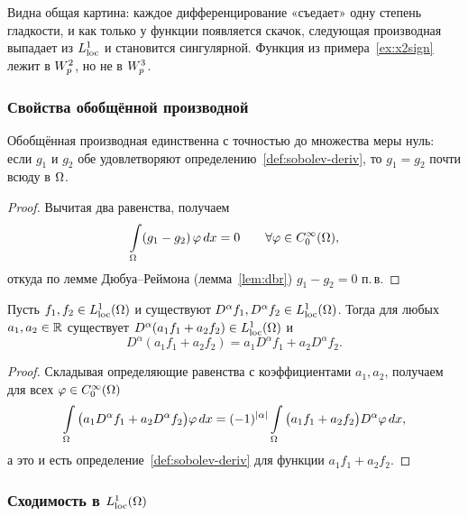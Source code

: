 \begin{idea}
Видна общая картина: каждое дифференцирование «съедает» одну степень гладкости, и как
только у функции появляется скачок, следующая производная выпадает из $L^1_{\mathrm{loc}}$ и становится
сингулярной. Функция из примера~\ref{ex:x2sign} лежит в $W_{p}^{2}$, но не в $W_{p}^{3}$.
\end{idea}

\subsubsection*{Свойства обобщённой производной}

\begin{proposition}\label{prop:deriv-unique}
Обобщённая производная единственна с точностью до множества меры нуль: если $g_1$ и $g_2$
обе удовлетворяют определению~\ref{def:sobolev-deriv}, то $g_1 = g_2$ почти всюду в $\Omega$.
\end{proposition}

\begin{proof}
Вычитая два равенства, получаем
\[
  \int\limits_\Omega (g_1 - g_2)\,\varphi\, dx = 0 \qquad \forall \varphi \in C_0^\infty(\Omega) ,
\]
откуда по лемме Дюбуа--Реймона (лемма~\ref{lem:dbr}) $g_1 - g_2 = 0$ п.\,в.
\end{proof}

\begin{proposition}\label{prop:deriv-linear}
Пусть $f_1, f_2 \in L^1_{\mathrm{loc}}(\Omega)$ и существуют $D^\alpha f_1, D^\alpha f_2 \in L^1_{\mathrm{loc}}(\Omega)$.
Тогда для любых $a_1, a_2 \in \mathbb{R}$ существует
$D^\alpha(a_1 f_1 + a_2 f_2) \in L^1_{\mathrm{loc}}(\Omega)$ и
\[
  D^\alpha(a_1 f_1 + a_2 f_2) = a_1 D^\alpha f_1 + a_2 D^\alpha f_2 .
\]
\end{proposition}

\begin{proof}
Складывая определяющие равенства с коэффициентами $a_1, a_2$, получаем для всех
$\varphi \in C_0^\infty(\Omega)$
\[
  \int\limits_\Omega \big(a_1 D^\alpha f_1 + a_2 D^\alpha f_2\big)\varphi\, dx
  = (-1)^{|\alpha|} \int\limits_\Omega \big(a_1 f_1 + a_2 f_2\big) D^\alpha \varphi\, dx ,
\]
а это и есть определение~\ref{def:sobolev-deriv} для функции $a_1 f_1 + a_2 f_2$.
\end{proof}

\subsubsection*{Сходимость в $L^1_{\mathrm{loc}}(\Omega)$}

